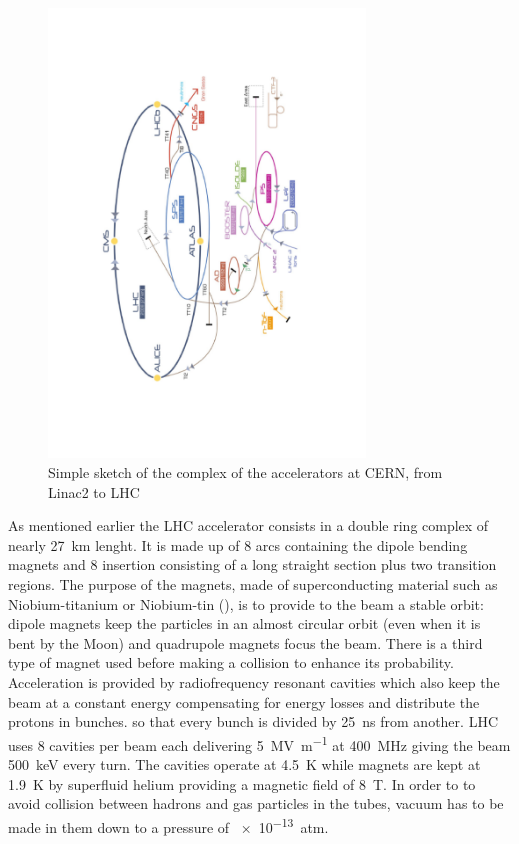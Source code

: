 \begin{figure}[tp]
	\centering
	\includegraphics[width=0.75\textwidth,angle=-90]{LHC_ATLAS/CERNaccelerators}
	\caption{Simple sketch of the complex of the accelerators at CERN, from Linac2 to LHC}	
	\label{fig:accelerators}
\end{figure}

As mentioned earlier the LHC accelerator consists in a double ring complex of nearly \SI{27}{\km} lenght. It is made up of 8 arcs containing the dipole bending magnets and 8 insertion consisting of a long straight section plus two transition regions. The purpose of the magnets, made of superconducting material such as Niobium-titanium or Niobium-tin (), is to provide to the beam a stable orbit: dipole magnets keep the particles in an almost circular orbit (even when it is bent by the Moon) and quadrupole magnets focus the beam. There is a third type of magnet used before making a collision to enhance its probability. Acceleration is provided by radiofrequency resonant cavities which also keep the beam at a constant energy compensating for energy losses and distribute the protons in bunches. so that every bunch is divided by \SI{25}{\ns} from another. LHC uses 8 cavities per beam each delivering \SI{5}{MV\per\m} at \SI{400}{\MHz} giving the beam \SI{500}{\keV} every turn. The cavities operate at \SI{4.5}{\K} while magnets are kept at \SI{1.9}{\K} by superfluid helium providing a magnetic field of \SI{8}{\tesla}.
In order to to avoid collision between hadrons and gas particles in the tubes, vacuum has to be made in them down to a pressure of \SI{e-13}{atm}.

